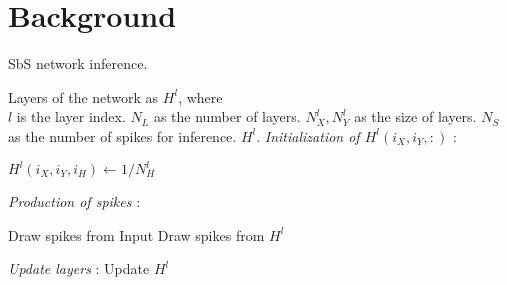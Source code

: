 \section{Background}
\label{sec:background}


\begin{algorithm}[h!]
	\label{alg:inference}
	\caption{SbS network inference.}
	
	\begin{algorithmic}[1]
		\SetAlgoLined
		\renewcommand{\algorithmicrequire}{\textbf{input:}}
		\renewcommand{\algorithmicensure}{\textbf{output:}}
		\REQUIRE Layers of the network as $H^l$, where\\
		$l$ is the layer index.
		\REQUIRE $N_{L}$ as the number of layers.
		\REQUIRE $N^l_{X}, N^l_{Y}$ as the size of layers.
		\REQUIRE $N_{S}$ as the number of spikes for inference.
		\ENSURE $H^l$.
			\textit{Initialization of $H^l(i_X,i_Y,:)$} :
			
							\STATE $H^l(i_X,i_Y,i_{H}) \leftarrow 1/N^l_H$
						\ENDFOR
					\ENDFOR
				\ENDFOR
			\ENDIF
			
			\textit{Production of spikes} :
			
					\STATE Draw spikes from Input 
				\ELSE
					\STATE Draw spikes from $H^l$ 
				\ENDIF
				
			\ENDFOR

			\textit{Update layers} :
				\STATE Update $H^l$ 
			\ENDFOR

		\ENDFOR
	\end{algorithmic} 
\end{algorithm}


